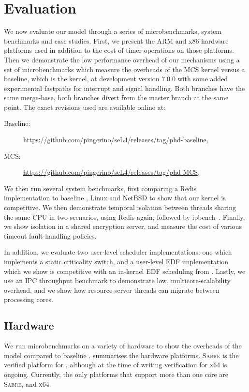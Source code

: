 \chapter{Evaluation}
\label{chap:evaluation}

We now evaluate our model through a series of microbenchmarks, system benchmarks and case studies.
First, we present the ARM and x86 hardware platforms used in addition to the cost of timer operations on those
platforms. Then we demonstrate the low performance overhead of our mechanisms using a set of 
microbenchmarks which measure the overheads of the MCS kernel versus a baseline, which is the \selfour
kernel, at development version 7.0.0 with some added experimental fastpaths for interrupt and signal
handling. Both branches have the same merge-base, \ie both branches divert from the master branch at
the same point. The exact revisions used are available online at:
\begin{description}
    \item[Baseline:] \url{https://github.com/pingerino/seL4/releases/tag/phd-baseline},
    \item[MCS:] \url{https://github.com/pingerino/seL4/releases/tag/phd-MCS}.
\end{description}

We then run several system benchmarks, first comparing a Redis~\citep{redis:url} 
implementation to baseline \selfour, Linux and NetBSD to show that our kernel is competitive.
We then demonstrate temporal
isolation between threads sharing the same CPU in two scenarios,
using Redis again, followed by ipbench~\citep{Wienand_Macpherson_04}. Finally, we show isolation in a
shared encryption server, and measure the cost of various timeout fault-handling policies. 

In addition, we evaluate two user-level scheduler implementations: one which implements a static
criticality switch, and a user-level \gls{EDF} implementation which we show is
competitive with an in-kernel \gls{EDF} scheduling from \litmus. Lastly, we use an \gls{IPC}
throughput benchmark to demonstrate low, multicore-scalability overhead, and we show 
how resource server threads can migrate between processing cores.

\section{Hardware}

We run microbenchmarks on a variety of hardware to show the overheads of the model compared to
baseline \selfour.  summarises the hardware platforms. \textsc{Sabre} is
the verified platform for \selfour, although at the time of writing verification for \textsc{x64} is
ongoing. Currently, the only platforms that support more than one core are \textsc{Sabre},
and \textsc{x64}.

